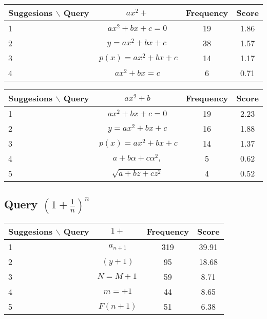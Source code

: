 \documentclass[12pt]{article} %
\begin{document}
\begin{center}
\begin{tabular}{lccc}
Suggesions $\backslash$ Query  & $ ax^2 + $ & Frequency & Score \\
\hline
 1 &  $ ax^{2}+bx+c=0 $ & 19 & 1.86 \\
 2 &  $ y=ax^{2}+bx+c\, $ & 38 & 1.57 \\
 3 &  $ \ p(x)=ax^{2}+bx+c $ & 14 & 1.17 \\
 4 &  $ ax^{2}+bx=c $ & 6 & 0.71 \\
\end{tabular}
\end{center}

\begin{center}
\begin{tabular}{lccc}
Suggesions $\backslash$ Query  & $ ax^2 + b $ & Frequency & Score \\
\hline
 1 &  $ ax^{2}+bx+c=0 $ & 19 & 2.23 \\
 2 &  $ y=ax^{2}+bx+c $ & 16 & 1.88 \\
 3 &  $ \ p(x)=ax^{2}+bx+c $ & 14 & 1.37 \\
 4 &  $ a+b\alpha+c\alpha^{2}, $ & 5 & 0.62 \\
 5 &  $ \sqrt{a+bz+cz^{2}} $ & 4 & 0.52 \\
\end{tabular}
\end{center}

\pagebreak

\subsection{Query $(1+ \frac 1 n)^n$}

\begin{center}
\begin{tabular}{lccc}
Suggesions $\backslash$ Query  & $ 1+ $ & Frequency & Score \\
\hline
 1 &  $ \displaystyle a_{n+1} $ & 319 & 39.91 \\
 2 &  $ (y+1) $ & 95 & 18.68 \\
 3 &  $ N=M+1\, $ & 59 & 8.71 \\
 4 &  $ m=+1 $ & 44 & 8.65 \\
 5 &  $ F(n+1) $ & 51 & 6.38 \\
\end{tabular}
\end{center}
\end{document}
